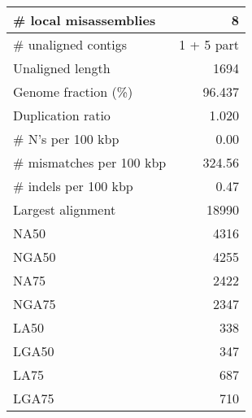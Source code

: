 \documentclass[12pt,a4paper]{article}
\begin{document}
\begin{table}[ht]
\begin{center}
\begin{tabular}{|l*{1}{|r}|}
\# local misassemblies & 8 \\ \hline
\# unaligned contigs & 1 + 5 part \\ \hline
Unaligned length & 1694 \\ \hline
Genome fraction (\%) & 96.437 \\ \hline
Duplication ratio & 1.020 \\ \hline
\# N's per 100 kbp & 0.00 \\ \hline
\# mismatches per 100 kbp & 324.56 \\ \hline
\# indels per 100 kbp & 0.47 \\ \hline
Largest alignment & 18990 \\ \hline
NA50 & 4316 \\ \hline
NGA50 & 4255 \\ \hline
NA75 & 2422 \\ \hline
NGA75 & 2347 \\ \hline
LA50 & 338 \\ \hline
LGA50 & 347 \\ \hline
LA75 & 687 \\ \hline
LGA75 & 710 \\ \hline
\end{tabular}
\end{center}
\end{table}
\end{document}
